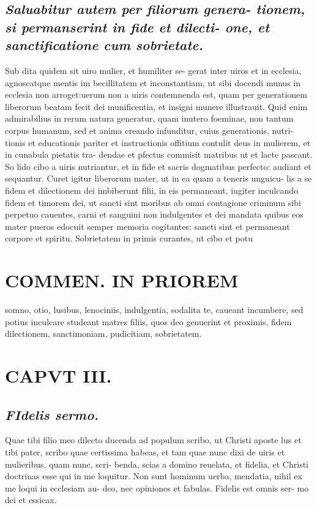 \documentclass{article}
\begin{document}
\begin{pages}
\subsection*{\textit{Saluabitur autem per filiorum genera- tionem, si permanserint in fide et dilecti- one, et sanctificatione cum sobrietate. }}\pstart Sub dita quidem sit uiro mulier, et humiliter se- gerat inter uiros et in ecclesia, agnoscatque mentis im becillitatem et inconstantiam, ut sibi docendi munus in ecclesia non arroget:uerum non a uiris contemnenda est, quam per generationem liberorum beatam fecit dei munificentia, et insigni munere illustrauit. Quid enim admirabilius in rerum natura generatur, quam inutero foeminae, non tantum corpus humanum, sed et anima creando infunditur, cuius generationis, nutri- tionis et educationis pariter et instructionis offitium contulit deus in mulierem, et in cunabula pietatis tra- dendae et pfectus commisit matribus ut et lacte pascant. So lido cibo a uiris nutriantur, et in fide et sacris dogmatibus perfecto: audiant et sequantur. Curet igitur liberorum mater, ut in ea quam a teneris unguicu- lis a se fidem et dilectionem dei imbiberunt filii, in eis permaneant, iugiter inculcando fidem et timorem dei, ut sancti sint moribus ab omni contagione criminum sibi perpetuo cauentes, carni et sanguini non indulgentes et dei mandata quibus eos mater pueros edocuit semper memoria cogitantes: sancti sint et permaneant corpore et spiritu. Sobrietatem in primis curantes, ut cibo et potu  \pend
\section*{COMMEN. IN PRIOREM }
\marginpar{[ p.64 ]}\pstart somno, otio, lusibus, lenociniis, indulgentia, sodalita te, caueant incumbere, sed potius inculcare studeant matres filiis, quos deo genuerint et proximis, fidem dilectionem, sanctimoniam, pudicitiam, sobrietatem.  \pend
\endnumbering\beginnumbering\section{CAPVT III.}
{}
\subsection*{\textit{\huge\textbf{F}\normalsize Idelis sermo. }}\pstart Quae tibi filio meo dilecto ducenda ad populum scribo, ut Christi aposte lus et tibi pater, scribo quae certissima habeas, et tam quae nunc dixi de uiris et mulieribus, quam nunc, scri- benda, scias a domino reuelata, et fidelia, et Christi doctrinas esse qui in me loquitur. Non sunt hominum uerba, mendatia, nihil ex me loqui in ecclesiam au- deo, nec opiniones et fabulas. Fidelis est omnis ser- mo dei et essicax.  \pend
{}
{}

\end{pages}
\end{document}

